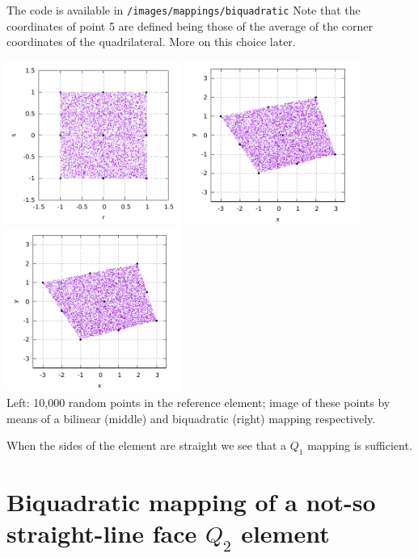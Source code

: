 The code is available in {\tt /images/mappings/biquadratic}
Note that the coordinates of point 5 are defined being those of the 
average of the corner coordinates of the quadrilateral. More on this choice later.

\begin{center}
\includegraphics[width=5.7cm]{images/mappings/biquadratic/rs.pdf}
\includegraphics[width=5.7cm]{images/mappings/biquadratic/xyQ1.pdf}
\includegraphics[width=5.7cm]{images/mappings/biquadratic/xyQ2.pdf}\\
{\captionfont Left: 10,000 random points in the reference element; 
image of these points by means of a bilinear (middle) and biquadratic (right)
mapping respectively.}
\end{center}
When the sides of the element are straight we see that a $Q_1$ mapping is sufficient.

\section{Biquadratic mapping of a not-so straight-line face $Q_2$ element }

